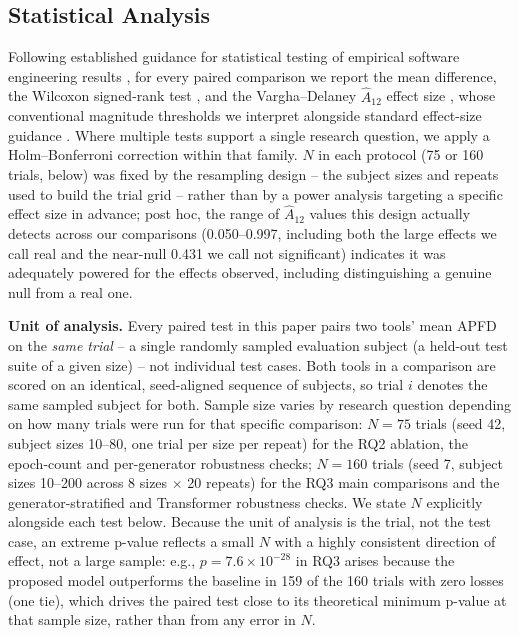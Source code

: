 \documentclass[smallextended]{svjour3}
\begin{document}
\subsection{Statistical Analysis}
Following established guidance for statistical testing of empirical
software engineering results \citep{arcuri2011practical}, for every paired
comparison we report the mean difference, the Wilcoxon signed-rank test
\citep{wilcoxon1992individual}, and the Vargha--Delaney $\hat{A}_{12}$
effect size \citep{vargha2000critique}, whose conventional magnitude
thresholds we interpret alongside standard effect-size guidance
\citep{cohen2013statistical}. Where multiple tests support a single
research question, we apply a Holm--Bonferroni correction
\citep{holm1979simple} within that family. $N$ in each protocol
(75 or 160 trials, below) was fixed by the resampling design -- the
subject sizes and repeats used to build the trial grid -- rather than by
a power analysis targeting a specific effect size in advance; post hoc,
the range of $\hat{A}_{12}$ values this design actually detects across
our comparisons (0.050--0.997, including both the large effects we call
real and the near-null 0.431 we call not significant) indicates it was
adequately powered for the effects observed, including distinguishing a
genuine null from a real one.

\textbf{Unit of analysis.} Every paired test in this paper pairs two tools'
mean APFD on the \emph{same trial} -- a single randomly sampled evaluation
subject (a held-out test suite of a given size) -- not individual test
cases. Both tools in a comparison are scored on an identical, seed-aligned
sequence of subjects, so trial $i$ denotes the same sampled subject for
both. Sample size varies by research question depending on how many trials
were run for that specific comparison: $N=75$ trials (seed 42, subject
sizes 10--80, one trial per size per repeat) for the RQ2 ablation, the
epoch-count and per-generator robustness checks; $N=160$ trials (seed 7,
subject sizes 10--200 across 8 sizes $\times$ 20 repeats) for the RQ3 main
comparisons and the generator-stratified and Transformer robustness
checks. We state $N$ explicitly alongside each test below. Because the
unit of analysis is the trial, not the test case, an extreme p-value
reflects a small $N$ with a highly consistent direction of effect, not a
large sample: e.g., $p=7.6\times10^{-28}$ in RQ3 arises because the
proposed model outperforms the baseline in 159 of the 160 trials with zero
losses (one tie), which drives the paired test close to its theoretical
minimum p-value at that sample size, rather than from any error in $N$.
\end{document}
